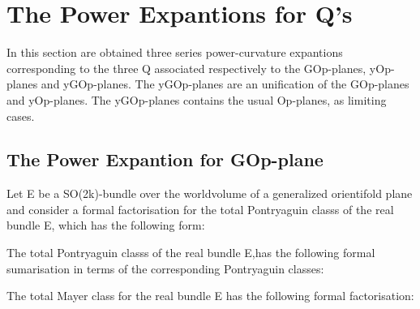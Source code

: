 \documentclass[a4paper,a4paper]{article}
\begin{document}
\section{The Power Expantions for Q's}
In this section are obtained three series power-curvature expantions corresponding to the three Q associated respectively to the GOp-planes, yOp-planes and yGOp-planes.  The yGOp-planes are an unification of the GOp-planes and yOp-planes. The yGOp-planes contains the usual Op-planes, as
limiting cases.
\subsection{The Power Expantion for GOp-plane }

Let E be a SO(2k)-bundle over the worldvolume of a generalized orientifold plane and consider a formal factorisation for the total Pontryaguin classs of the real bundle E, which has the following form:

\begin{center}
{  \coordHE{} }
\end{center}
The total Pontryaguin classs of the real bundle E,has the following formal sumarisation in terms of the corresponding Pontryaguin classes: 
\begin{center}
{  \coordHE{} }
\end{center}
The total Mayer class for the real bundle E has the following formal factorisation:
\begin{center}
{  \coordHE{} }
\end{center}
\end{document}
